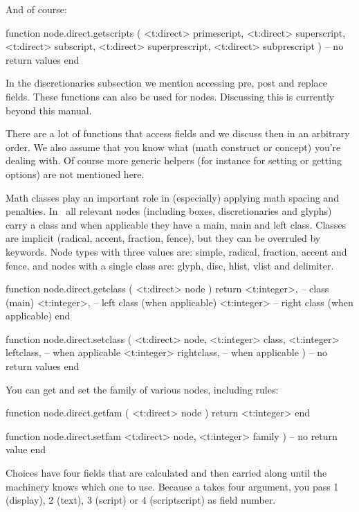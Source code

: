 And of course:

\starttyping[option=LUA]
function node.direct.getscripts (
    <t:direct> primescript,
    <t:direct> superscript,
    <t:direct> subscript,
    <t:direct> superprescript,
    <t:direct> subprescript
)
    -- no return values
end
\stoptyping

In the discretionaries subsection we mention accessing pre, post and replace
fields. These functions can also be used for  nodes. Discussing
this is currently beyond this manual.

There are a lot of functions that access fields and we discuss then in an
arbitrary order. We also assume that you know what (math construct or concept)
you're dealing with. Of course more generic helpers (for instance for setting or
getting options) are not mentioned here.

Math classes play an important role in (especially) applying math spacing and
penalties. In \LUAMETATEX\ all relevant nodes (including boxes, discretionaries
and glyphs) carry a class and when applicable they have a main, main and left
class. Classes are implicit (radical, accent, fraction, fence), but they can be
overruled by keywords. Node types with three values are: simple, radical,
fraction, accent and fence, and nodes with a single class are: glyph, disc,
hlist, vlist and delimiter.

\starttyping[option=LUA]
function node.direct.getclass ( <t:direct> node )
    return
        <t:integer>, -- class       (main)
        <t:integer>, -- left class  (when applicable)
        <t:integer>  -- right class (when applicable)
end

function node.direct.setclass (
    <t:direct>  node,
    <t:integer> class,
    <t:integer> leftclass,  -- when applicable
    <t:integer> rightclass, -- when applicable
)
    -- no return values
end
\stoptyping

You can get and set the family of various nodes, including rules:

\starttyping[option=LUA]
function node.direct.getfam ( <t:direct> node )
    return <t:integer>
end

function node.direct.setfam
    <t:direct>  node,
    <t:integer> family
)
     -- no return value
end
\stoptyping

Choices have four fields that are calculated and then carried along until the
machinery knows which one to use. Because a  takes four
argument, you pass 1 (display), 2 (text), 3 (script) or 4 (scriptscript) as field
number.

